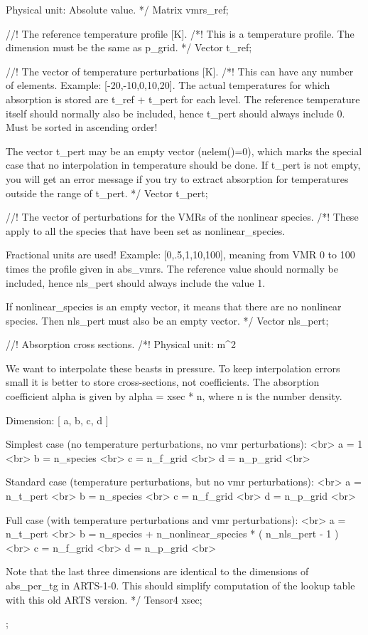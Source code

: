 \begin{code}
{    Physical unit: Absolute value. */
  Matrix    vmrs_ref;

  //! The reference temperature profile [K].
  /*! This is a temperature profile. The dimension must be the same as
    p_grid. */
  Vector    t_ref;

  //! The vector of temperature perturbations [K].
  /*! This can have any number of elements. Example:
    [-20,-10,0,10,20]. The actual temperatures for which absorption is
    stored are t_ref + t_pert for each level. The reference
    temperature itself should normally also be included, hence 
    t_pert should always include 0. Must be sorted in ascending order!

    The vector t_pert may be an empty vector (nelem()=0), which marks
    the special case that no interpolation in temperature should be
    done. If t_pert is not empty, you will get an error message if you
    try to extract absorption for temperatures outside the range of
    t_pert. */
  Vector    t_pert;

  //! The vector of perturbations for the VMRs of the nonlinear species.
  /*!
    These apply to all the species that have been set as
    nonlinear_species.

    Fractional units are used! Example: [0,.5,1,10,100],
    meaning from VMR 0 to 100 times the profile given in
    abs\_vmrs. The reference value should normally be included, hence
    nls_pert should always include the value 1.

    If nonlinear_species is an empty vector, it means that there are
    no nonlinear species. Then nls_pert must also be an empty vector.
  */
  Vector    nls_pert;

  //! Absorption cross sections.
  /*!
    Physical unit: m^2

    \attention We want to interpolate these beasts in pressure. To
    keep interpolation errors small it is better to store
    cross-sections, not coefficients. The absorption coefficient alpha
    is given by alpha = xsec * n, where n is the number density.

    Dimension: [ a, b, c, d ]

    Simplest case (no temperature perturbations, 
    no vmr perturbations): <br>
    a = 1 <br>
    b = n_species <br>
    c = n_f_grid <br>
    d = n_p_grid <br>

    Standard case (temperature perturbations, 
    but no vmr perturbations): <br>
    a = n_t_pert <br>
    b = n_species <br>
    c = n_f_grid <br>
    d = n_p_grid <br>

    Full case (with temperature perturbations 
    and vmr perturbations): <br>
    a = n_t_pert <br>
    b = n_species + n_nonlinear_species * ( n_nls_pert - 1 ) <br>
    c = n_f_grid <br>
    d = n_p_grid <br>

    Note that the last three dimensions are identical to the
    dimensions of abs_per_tg in ARTS-1-0. This should simplify
    computation of the lookup table with this old ARTS version.
  */
  Tensor4 xsec;
};
\end{code}

